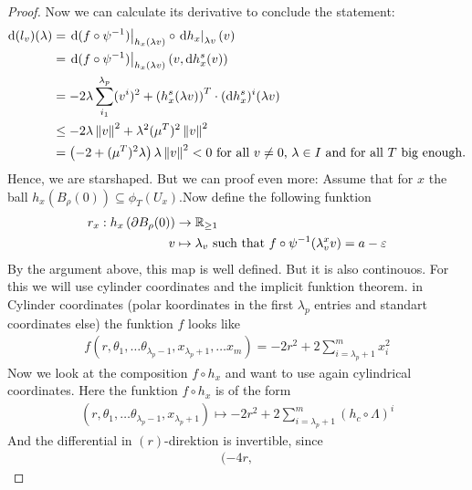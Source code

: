 \begin{proof}
		Now we can calculate its derivative to conclude the statement: 
		\begin{align*}
				\mathop{}\!\mathrm{d} (l_v)(\lambda)
			&=\left.\mathop{}\!\mathrm{d} (f\circ \psi^{-1})\right|_{h_x(\lambda v)}\circ \left.\mathop{}\!\mathrm{d} h_x\right|_{\lambda v} (v)\\
			&=\left.\mathop{}\!\mathrm{d} (f\circ \psi^{-1})\right|_{h_x(\lambda v)} (v,\mathop{}\!\mathrm{d} h_x^s(v))\\
			&=-2\lambda \sum_{i_1}^{\lambda_p}(v^i)^2+\left(h^s_x(\lambda v)\right)^T\cdot (\mathop{}\!\mathrm{d} h_x^s)^i(\lambda v)\\
			&\leq-2\lambda \left\lVert v\right\rVert^2 +\lambda^2 (\mu^T )^2\left\lVert v\right\rVert^2\\
			&= \left( -2+(\mu^T)^2\lambda \right) \lambda \left\lVert v\right\rVert^2<0 \text{ for all $v\neq 0$, $\lambda \in I$ and for all $T$ big enough.}
		\end{align*}
		Hence, we are starshaped. But we can proof even more: 
		Assume that for $x$ the ball $h_x(B_{\rho}(0))\subseteq \phi_T(U_x)$.Now define the following funktion 
		\begin{align*}
			r_x: h_x\left( \partial B_{\rho}(0) \right)&\to \mathbb{R}_{\geq 1}\\
			v &\mapsto \lambda_v \text{ such that }f\circ \psi^{-1}(\lambda^x_v v)=a-\varepsilon
		\end{align*} By the argument above, this map is well defined. But it is also continouos. For this we will use cylinder coordinates and the implicit funktion theorem. in Cylinder coordinates (polar koordinates in the first $\lambda_p$ entries and standart coordinates else) the funktion $f$ looks like
		\begin{align*}
			f(r,\theta_1,\dots \theta_{\lambda_p-1},x_{\lambda_{p}+1},\dots x_{m})=-2r^2+2\sum_{i=\lambda_p+1}^mx_i^2
		\end{align*}
		Now we look at the composition $f\circ h_x$ and want to use again cylindrical coordinates. Here the funktion $f\circ h_x$ is of the form \begin{align*}
			(r,\theta_1,\dots \theta_{\lambda_p-1},x_{\lambda_{p}+1})\mapsto -2r^2+2\sum_{i=\lambda_p+1}^m (h_c\circ \Lambda)^i
		\end{align*} And the differential in $(r)$-direktion is invertible, since 
		\begin{align*}
			(-4r,
		\end{align*}
		
	\end{proof}

